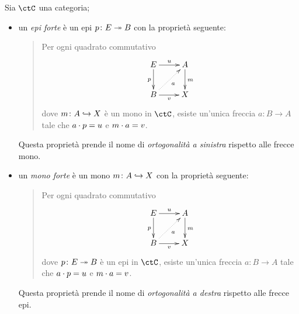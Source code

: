\begin{definition}\label{mepi_forte}
 Sia \(\ctC\) una categoria;
 \begin{itemize}
  \item un \emph{epi forte} è un epi \(p \colon E\twoheadrightarrow B\) con la proprietà seguente:
        \begin{quote}
         Per ogni quadrato commutativo
         \[\xymatrix{
           E \ar[r]^u\ar[d]_p & A\ar[d]^m\\
           B \ar[r]_v \ar@{.>}[ur]_a & X
          }\]
         dove \(m \colon A\hookrightarrow X\) è un mono in \(\ctC\), esiste un'unica freccia \(a \colon B\to A\) tale che \(a\cdot p=u\) e \(m\cdot a =v\).
        \end{quote}
        Questa proprietà prende il nome di \emph{ortogonalità a sinistra} rispetto alle frecce mono.
  \item un \emph{mono forte} è un mono \(m \colon A\hookrightarrow X\) con la proprietà seguente:
        \begin{quote}
         Per ogni quadrato commutativo
         \[\xymatrix{
           E \ar[r]^u\ar[d]_p & A\ar[d]^m\\
           B \ar[r]_v \ar@{.>}[ur]_a & X
          }\]
         dove \(p \colon E\twoheadrightarrow B\) è un epi in \(\ctC\), esiste un'unica freccia \(a \colon B\to A\) tale che \(a\cdot p=u\) e \(m\cdot a =v\).
        \end{quote}
        Questa proprietà prende il nome di \emph{ortogonalità a destra} rispetto alle frecce epi.
 \end{itemize}
\end{definition}

